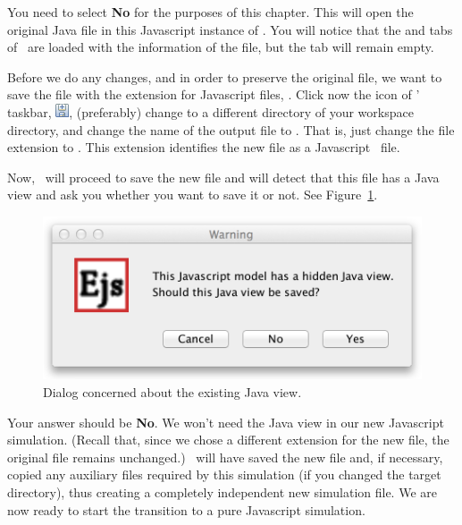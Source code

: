 You need to select \textbf{No} for the purposes of this chapter. This will open the original Java file in this Javascript instance of \ejs. You will notice that the  and  tabs of \ejs\ are loaded with the information of the  file, but the  tab will remain empty.

Before we do any changes, and in order to preserve the original file, we want to save the file with the extension for Javascript files, . Click now the  icon of \ejs' taskbar, \includegraphics[scale=\linescale]{../_common/icons_png/saveAsSmall.png}, (preferably) change to a different directory of your workspace  directory, and change the name of the output file to . That is, just change the file  extension to . This extension identifies the new file as a Javascript \ejs\ file. 

Now, \ejs\ will proceed to save the new file and will detect that this file has a Java view and ask you whether you want to save it or not. See Figure~\ref{fig:04JavatoJS/ForgetJavaView}. 

\begin{figure}[htb]
  \centering
  \includegraphics[scale=\scale]{04JavatoJS/images/ForgetJavaView.png}
  \caption{Dialog concerned about the existing Java view.}
  \label{fig:04JavatoJS/ForgetJavaView}
\end{figure}

\noindent Your answer should be \textbf{No}. We won't need the Java view in our new Javascript simulation. (Recall that, since we chose a different extension for the new file, the original  file remains unchanged.) \ejs\ will have saved the new file and, if necessary, copied any auxiliary files required by this simulation (if you changed the target directory), thus creating a completely independent new simulation file. We are now ready to start the transition to a pure Javascript simulation.

